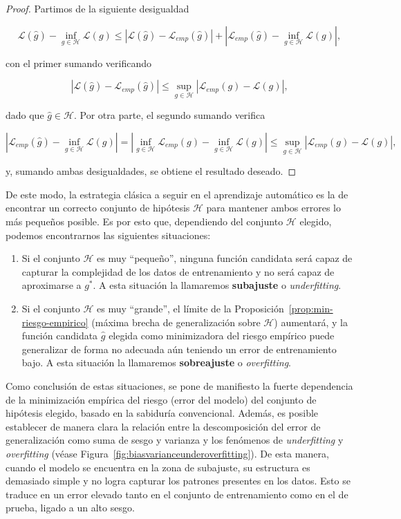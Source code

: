 \begin{proof}
    Partimos de la siguiente desigualdad

    \[ \mathcal{L}(\hat{g}) - \inf_{g \in \mathcal{H}}\mathcal{L}(g) \leq  |\mathcal{L}(\hat{g}) - \mathcal{L}_{emp}(\hat{g})| + |\mathcal{L}_{emp}(\hat{g}) - \inf_{g \in \mathcal{H}}\mathcal{L}(g)|, \]

    con el primer sumando verificando

    \[ |\mathcal{L}(\hat{g}) - \mathcal{L}_{emp}(\hat{g})| \leq \sup_{g \in \mathcal{H}}|\mathcal{L}_{emp}(g) - \mathcal{L}(g)|, \]

    dado que $\hat{g} \in \mathcal{H}$. Por otra parte, el segundo sumando verifica

    \[ |\mathcal{L}_{emp}(\hat{g}) - \inf_{g \in \mathcal{H}}\mathcal{L}(g)| = |\inf_{g \in \mathcal{H}} \mathcal{L}_{emp}(g) - \inf_{g \in \mathcal{H}}\mathcal{L}(g)| \leq \sup_{g \in \mathcal{H}}|\mathcal{L}_{emp}(g) - \mathcal{L}(g)|, \]

    y, sumando ambas desigualdades, se obtiene el resultado deseado.
\end{proof}

De este modo, la estrategia clásica a seguir en el aprendizaje automático es la de encontrar un correcto conjunto de hipótesis $\mathcal{H}$ para mantener ambos errores lo más pequeños posible. Es por esto que, dependiendo del conjunto $\mathcal{H}$ elegido, podemos encontrarnos las siguientes situaciones:

\begin{enumerate}
    \item Si el conjunto $\mathcal{H}$ es muy ``pequeño'', ninguna función candidata será capaz de capturar la complejidad de los datos de entrenamiento y no será capaz de aproximarse a $g^{*}$. A esta situación la llamaremos \textbf{subajuste} o \emph{underfitting}.
    \item Si el conjunto $\mathcal{H}$ es muy ``grande'', el límite de la Proposición~\ref{prop:min-riesgo-empirico} (máxima brecha de generalización sobre $\mathcal{H}$) aumentará, y la función candidata $\hat{g}$ elegida como minimizadora del riesgo empírico puede generalizar de forma no adecuada aún teniendo un error de entrenamiento bajo. A esta situación la llamaremos \textbf{sobreajuste} o \emph{overfitting}.
\end{enumerate}

Como conclusión de estas situaciones, se pone de manifiesto la fuerte dependencia de la minimización empírica del riesgo (error del modelo) del conjunto de hipótesis elegido, basado en la sabiduría convencional. Además, es posible establecer de manera clara la relación entre la descomposición del error de generalización como suma de sesgo y varianza y los fenómenos de \emph{underfitting} y \emph{overfitting} (véase Figura~\ref{fig:biasvarianceunderoverfitting}). De esta manera, cuando el modelo se encuentra en la zona de subajuste, su estructura es demasiado simple y no logra capturar los patrones presentes en los datos. Esto se traduce en un error elevado tanto en el conjunto de entrenamiento como en el de prueba, ligado a un alto sesgo.

